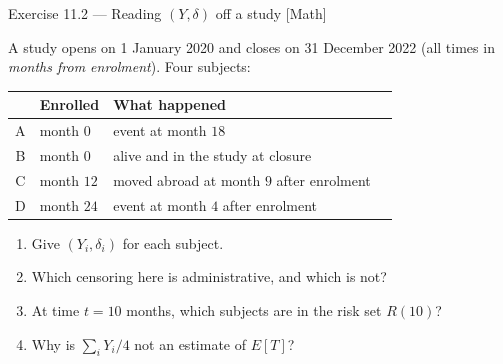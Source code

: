 \documentclass[aspectratio=169,11pt]{beamer}
\begin{document}
\begin{frame}{Exercise 11.2 --- Reading $(Y,\delta)$ off a study [Math]}
\begin{exercise}
  A study opens on 1 January 2020 and closes on 31 December 2022 (all times in
  \emph{months from enrolment}). Four subjects:
  \begin{center}\footnotesize
  \begin{tabular}{@{}clll@{}}
    \toprule
    & \textbf{Enrolled} & \textbf{What happened} & \\
    \midrule
    A & month $0$  & event at month $18$ & \\
    B & month $0$  & alive and in the study at closure & \\
    C & month $12$ & moved abroad at month $9$ after enrolment & \\
    D & month $24$ & event at month $4$ after enrolment & \\
    \bottomrule
  \end{tabular}
  \end{center}
  \begin{enumerate}
    \item Give $(Y_i,\delta_i)$ for each subject.
    \item Which censoring here is administrative, and which is not?
    \item At time $t=10$ months, which subjects are in the risk set $R(10)$?
    \item Why is $\sum_i Y_i/4$ not an estimate of $E[T]$?
  \end{enumerate}
\end{exercise}
\end{frame}
\end{document}
